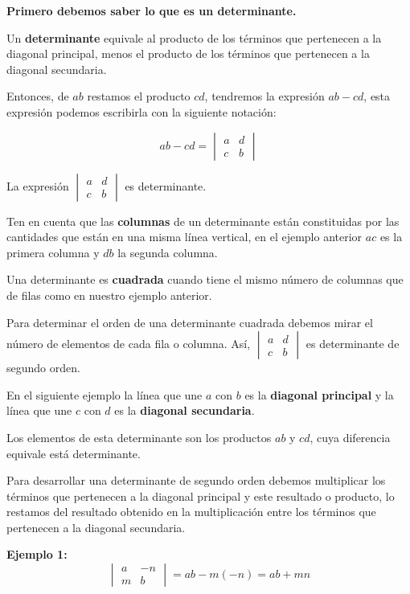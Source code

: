 \documentclass[12pt,a4paper]{article}
\begin{document}
\textbf{Primero debemos saber lo que es un determinante.}

Un \textbf{determinante} equivale al producto de los términos que pertenecen a la diagonal principal, menos el producto de los términos que pertenecen a la diagonal secundaria.

Entonces, de $ab$ restamos el producto $cd$, tendremos la expresión $ab - cd$, esta expresión podemos escribirla con la siguiente notación:

\[ ab - cd = \begin{vmatrix} a & d \\ c & b \end{vmatrix} \]

La expresión $\begin{vmatrix} a & d \\ c & b \end{vmatrix}$ es determinante.

Ten en cuenta que las \textbf{columnas} de un determinante están constituidas por las cantidades que están en una misma línea vertical, en el ejemplo anterior $ac$ es la primera columna y $db$ la segunda columna.

Una determinante es \textbf{cuadrada} cuando tiene el mismo número de columnas que de filas como en nuestro ejemplo anterior.

Para determinar el orden de una determinante cuadrada debemos mirar el número de elementos de cada fila o columna. Así, $\begin{vmatrix} a & d \\ c & b \end{vmatrix}$ es determinante de segundo orden.

En el siguiente ejemplo la línea que une $a$ con $b$ es la \textbf{diagonal principal} y la línea que une $c$ con $d$ es la \textbf{diagonal secundaria}.

Los elementos de esta determinante son los productos $ab$ y $cd$, cuya diferencia equivale está determinante.

Para desarrollar una determinante de segundo orden debemos multiplicar los términos que pertenecen a la diagonal principal y este resultado o producto, lo restamos del resultado obtenido en la multiplicación entre los términos que pertenecen a la diagonal secundaria.

\textbf{Ejemplo 1:}
\[ \begin{vmatrix} a & -n \\ m & b \end{vmatrix} = ab - m(-n) = ab + mn \]
\end{document}
